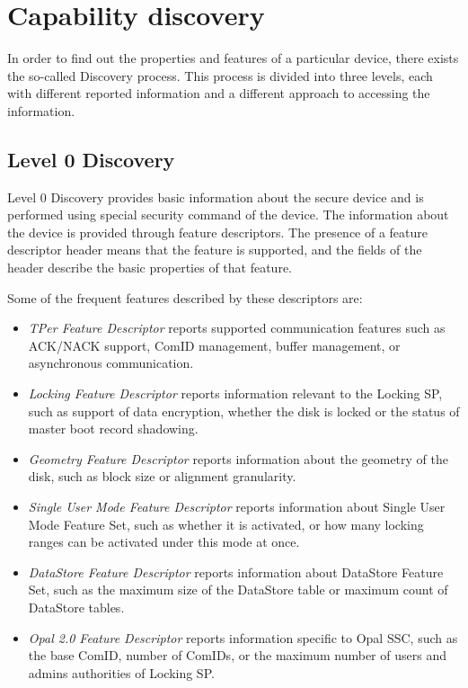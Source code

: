 \section{Capability discovery}
\label{section:opal_capability_discovery}

In order to find out the properties and features of a particular device, there exists the so-called Discovery process. 
This process is divided into three levels, each with different reported information and a different approach to accessing the information.

\subsection{Level 0 Discovery}

Level 0 Discovery provides basic information about the secure device and is performed using special security command of the device. The information about the device is provided through feature descriptors. The presence of a feature descriptor header means that the feature is supported, and the fields of the header describe the basic properties of that feature.

Some of the frequent features described by these descriptors are:
\begin{itemize}
\item \emph{TPer Feature Descriptor} reports supported communication features such as ACK/NACK support, ComID management, buffer management, or asynchronous communication.
\item \emph{Locking Feature Descriptor} reports information relevant to the Locking SP, such as support of data encryption, whether the disk is locked or the status of master boot record shadowing.
\item \emph{Geometry Feature Descriptor} reports information about the geometry of the disk, such as block size or alignment granularity.
\item \emph{Single User Mode Feature Descriptor} reports information about Single User Mode Feature Set, such as whether it is activated, or how many locking ranges can be activated under this mode at once.
\item \emph{DataStore Feature Descriptor} reports information about DataStore Feature Set, such as the maximum size of the DataStore table or maximum count of DataStore tables. 
\item \emph{Opal 2.0 Feature Descriptor} reports information specific to Opal SSC, such as the base ComID, number of ComIDs, or the maximum number of users and admins authorities of Locking SP.
\end{itemize}

